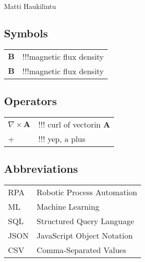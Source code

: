 \documentclass[english, 12pt, a4paper, elec, utf8, a-1b, online]{aaltothesis}
\begin{document}
\vspace{5mm}
{\hfill Matti Haukilintu \hspace{1cm}}

\newpage


\thesistableofcontents



\subsection*{Symbols}

\begin{tabular}{ll}
  $\mathbf{B}$  & !!!magnetic flux density  \\
  $\mathbf{B}$  & !!!magnetic flux density

\end{tabular}

\subsection*{Operators}

\begin{tabular}{ll}
  $\nabla \times \mathbf{A}$    & !!! curl of vectorin $\mathbf{A}$\\
  +     & !!! yep, a plus
\end{tabular}

\subsection*{Abbreviations}

\begin{tabular}{ll}
  RPA         & Robotic Process Automation \\
  ML          & Machine Learning \\
  SQL         & Structured Query Language \\
  JSON        & JavaScript Object Notation \\
  CSV         & Comma-Separated Values
\end{tabular}


\cleardoublepage

\end{document}
